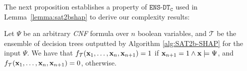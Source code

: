 The next proposition establishes a property of $\texttt{ENS-DT}_{\texttt{C}}$ used in Lemma~\ref{lemma:sat2bshap} to derive our complexity results:

\begin{proposition} \label{prop:dnf2bshaprf}
    Let $\Psi$ be an arbitrary \emph{CNF} formula over $n$ boolean variables, and  $\mathcal{T}$ be the ensemble of decision trees outputted by Algorithm \ref{alg:SAT2b-SHAP} for the input $\Psi$. 
    We have that $f_{\mathcal{T}}(\textbf{x}_{1}, \ldots, \textbf{x}_{n}, \textbf{x}_{n+1}) = 1$ if $\textbf{x}_{n+1} = 1 \land \textbf{x} \models \Psi
          $, and $f_{\mathcal{T}}(\textbf{x}_{1}, \ldots, \textbf{x}_{n}, \textbf{x}_{n+1})=0$, otherwise.
\end{proposition}



